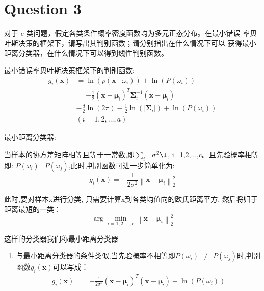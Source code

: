 \documentclass[homework]{IEEEtran}
\begin{document}
\section{Question 3}
\begin{CJK}{UTF8}{gkai}
    对于 c 类问题，假定各类条件概率密度函数均为多元正态分布。在最小错误
    率贝叶斯决策的框架下，请写出其判别函数；请分别指出在什么情况下可以
    获得最小距离分类器，在什么情况下可以得到线性判别函数。\par
最小错误率贝叶斯决策框架下的判别函数:
		\begin{equation}
            \begin{aligned}
            g_i(\mathbf{x}) &=\ln \left(p\left(\mathbf{x} \mid \omega_i\right)\right)+\ln \left(P\left(\omega_i\right)\right) \\
            &=-\frac{1}{2}\left(\mathbf{x}-\boldsymbol{\mu}_i\right)^T \boldsymbol{\Sigma}_i^{-1}\left(\mathbf{x}-\boldsymbol{\mu}_i\right)\\
            &-\frac{d}{2} \ln (2 \pi)-\frac{1}{2} \ln \left(\left|\boldsymbol{\Sigma}_i\right|\right)+\ln \left(P\left(\omega_i\right)\right)\\
            &\left(i=1,2, \ldots, a\right)
            \end{aligned} \nonumber
        \end{equation} \par
最小距离分类器:\par
         当样本的协方差矩阵相等且等于一常数,即$\sum_i$=$\sigma^2\I$, i=1,2,...,c。且先验概率相等即: $P\left(\omega_i\right)$=$P\left(\omega_j\right)$,此时,判别函数可进一步简单化为: $$g_i(\mathbf{x})=-\frac{1}{2 \sigma^2}\left\|\mathbf{x}-\boldsymbol{\mu}_i\right\|_2^2$$ \par
         此时,要对样本x进行分类, 只需要计算x到各类均值向的欧氏距离平方, 然后将归于距离最短的一类：$$\arg \min _{i=1,2, \ldots, c}\left\|\mathbf{x}-\boldsymbol{\mu}_i\right\|_2^2$$ \par 
         这样的分类器我们称最小距离分类器\par
    \begin{enumerate}[线性判别函数:]
        \item 与最小距离分类器的条件类似,当先验概率不相等即$P\left(\omega_i\right)$ $\neq$ $P\left(\omega_j\right)$时,判别函数$g_i(\mathbf{x})$可以写成：
        $$\begin{aligned}
            g_i(\mathbf{x}) &=-\frac{1}{2 \sigma^2}\left(\mathbf{x}-\boldsymbol{\mu}_i\right)^T\left(\mathbf{x}-\boldsymbol{\mu}_i\right)+\ln \left(P\left(\omega_i\right)\right) \\

\end{aligned}$$
\end{enumerate}
\end{CJK}
\end{document}
